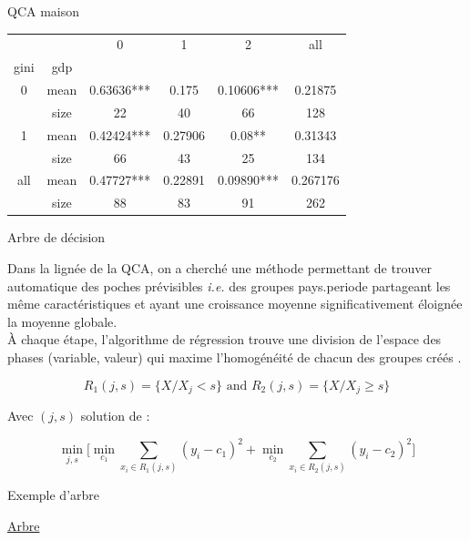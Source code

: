 \documentclass[xcolor=x11names,french]{beamer}
\renewcommand{\(}{\begin{columns}}
\renewcommand{\)}{\end{columns}}
\newcommand{\<}[1]{\begin{column}{#1}}
\renewcommand{\>}{\end{column}}
\begin{document}
\begin{frame}{QCA maison}



\begin{tabular}{c | c | c  c  c  c }
    &        &    0      &  1      &     2     &  all \\
gini&  gdp    &            &          &            &    \\  
\hline
0  &   mean & 0.63636***  &  0.175 & 0.10606*** &  0.21875\\
    & size    &  22   &    40      &   66    &   128\\
1   & mean & 0.42424*** & 0.27906    &  0.08**  & 0.31343\\
    &  size     &     66   &    43     &     25    &   134\\
all & mean & 0.47727*** & 0.22891 & 0.09890*** & 0.267176\\
    & size    &      88  &     83     &     91    &   262 \\
\end{tabular}

\end{frame}


\begin{frame}{Arbre de décision}

Dans la lignée de la QCA, on a cherché une méthode permettant de trouver automatique des \og poches prévisibles \fg{} \textit{i.e.} des groupes pays.periode partageant les même caractéristiques et ayant une croissance moyenne significativement éloignée la moyenne globale. \\

\`A chaque étape, l'algorithme de régression trouve une division de l'espace des phases (variable, valeur) qui maxime \og l'homogénéité de chacun des groupes créés \fg{}. 

\[
R_1(j, s) = \{X / X_j < s\} \text{  and  } R_2(j, s) = \{X / X_j \ge s\}
\]

Avec $(j, s)$ solution de : 

\[
\min_{j, s}\Big[\min_{c_1} \sum_{x_i \in R_1(j,s)} (y_i - c_1)^2 + \min_{c_2} \sum_{x_i \in R_2(j,s)} (y_i - c_2)^2 \Big]
\]

\end{frame}


\begin{frame}{Exemple d'arbre}

\href{./exemple_arbre.pdf}{Arbre}

\end{frame}
\end{document}
